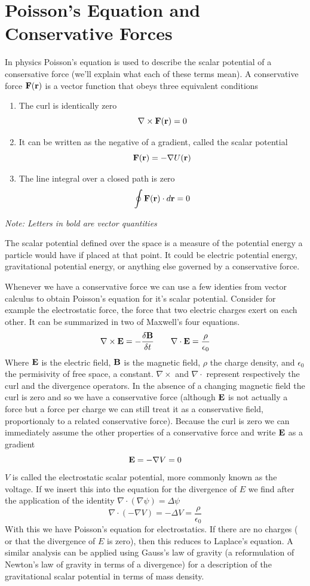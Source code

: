 \section{Poisson's Equation and Conservative Forces}
In physics Poisson's equation is used to describe the scalar potential of a consersative force (we'll explain what each of these terms mean). A conservative force $\bold{F}(\bold{r})$ is a vector function that obeys three equivalent conditions
\begin{enumerate}
	\item The curl is identically zero
			\[ \nabla \times \bold{F}(\bold{r}) = 0\]
	\item It can be written as the negative of a gradient, called the scalar potential
			\[ \bold{F}(\bold{r}) = - \nabla U(\bold{r}) \]
	\item The line integral over a closed path is zero
			\[ \oint \bold{F}(\bold{r}) \cdot d\bold{r} = 0 \]

\end{enumerate}
\textit{Note: Letters in bold are vector quantities}

The scalar potential defined over the space is a measure of the potential energy a particle would have if placed at that point.
It could be electric potential energy, gravitational potential energy, or anything else governed by a conservative force.

Whenever we have a conservative force we can use a few identies from vector calculus to obtain Poisson's equation for it's scalar potential. 
Consider for example the electrostatic force, the force that two electric charges exert on each other. 
It can be summarized in two of Maxwell's four equations.
\[
\nabla \times \bold{E} = -\frac{\delta \bold{B} } {\delta t} \qquad
\nabla \cdot \bold{E} = \frac{\rho}{\epsilon_0}
\]
Where $\bold{E}$ is the electric field, $\bold{B}$ is the magnetic field, $\rho$ the charge density, and $\epsilon_0$ the permisivity of free space, a constant. $\nabla \times$ and $\nabla \cdot$ represent respectively the curl and the divergence operators. In the absence of a changing magnetic field the curl is zero and so we have a conservative force (although $\bold{E}$ is not actually a force but a force per charge we can still treat it as a conservative field, proportionaly to a related conservative force). Because the curl is zero we can immediately assume the other properties of a conservative force and write $\bold{E}$ as a gradient
\[
\bold{E}  = - \nabla V = 0
\]
$V$ is called the electrostatic scalar potential, more commonly known as the voltage. 
If we insert this into the equation for the divergence of $E$ we find after the application of the identity $\nabla \cdot (\nabla\psi) = \Delta \psi$
\[
\nabla \cdot ( - \nabla V) = - \Delta V = \frac {\rho}{\epsilon_0}
\]
With this we have Poisson's equation for electrostatics. 
If there are no charges ( or that the divergence of $E$ is zero), then this reduces to Laplace's equation. 
A similar analysis can be applied using Gauss's law of gravity (a reformulation of Newton's law of gravity in terms of a divergence) for a description of the gravitational scalar potential in terms of mass density.

